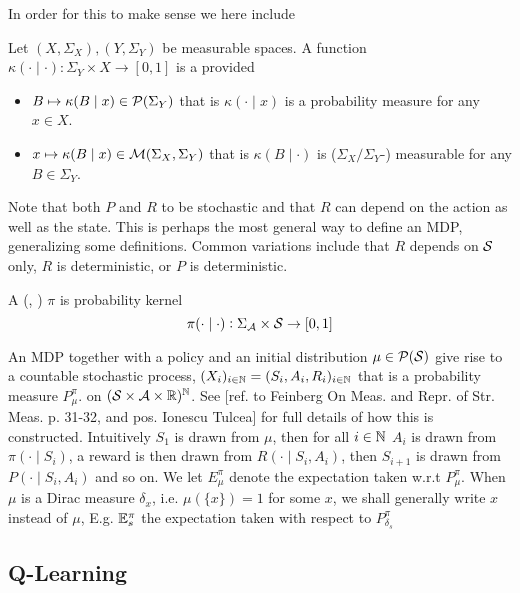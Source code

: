 \documentclass{article}
\begin{document}
In order for this to make sense we here include
\begin{defn}
  Let $(X, \Sigma_X), (Y, \Sigma_Y)$ be measurable spaces.
  A function $\kappa(\cdot \mid \cdot) : \Sigma_Y \times X \to [0,1]$
  is a  provided
  \begin{itemize}
    \item $B \mapsto \kappa(B \mid x) \in \mathcal{P}(\Sigma_Y)$
      that is $\kappa(\cdot \mid x)$ is a probability measure
      for any $x \in X$.
    \item $x \mapsto \kappa(B \mid x) \in \mathcal{M}(\Sigma_X, \Sigma_Y)$
      that is $\kappa(B \mid \cdot)$ is ($\Sigma_X/\Sigma_Y$-) measurable
      for any $B \in \Sigma_Y$.
  \end{itemize}
\end{defn}

Note that both $P$ and $R$ to be stochastic
and that $R$ can depend on the action as well as the state.
This is perhaps the most general way to define an MDP,
generalizing some definitions. Common variations include that
$R$ depends on $\mathcal{S}$ only,
$R$ is deterministic, or
$P$ is deterministic. %
\begin{defn}[Policy]
A (, ) 
$\pi$ is probability kernel
\[\pi(\cdot \mid \cdot) : \Sigma_{\mathcal{A}} \times \mathcal{S} \to [0,1] \]
\end{defn}

An MDP together with a policy and an initial distribution
$\mu \in \mathcal{P}(\mathcal{S})$
give rise to a countable stochastic process,
$ (X_i)_{i\in \mathbb{N}} = (S_i, A_i, R_i)_{i\in \mathbb{N}}$ 
that is a probability measure $P^\pi_\mu$. on
$(\mathcal{S} \times \mathcal{A} \times \mathbb{R})^\mathbb{N} $.
See [ref. to Feinberg On Meas. and Repr. of Str. Meas. p. 31-32,
and pos. Ionescu Tulcea] %
for full details of how this is constructed.
Intuitively $S_1$ is drawn from $\mu$,
then for all $i \in \mathbb{N}$
$A_i$ is drawn from $\pi(\cdot \mid S_i)$,
a reward is then drawn from $R(\cdot \mid S_i, A_i)$,
then $S_{i+1}$ is drawn from $P(\cdot \mid S_i, A_i)$ and so on.
We let $E^\pi_\mu$ denote the expectation taken w.r.t $P^\pi_\mu$.
When $\mu$ is a Dirac measure $\delta_x$, i.e. $\mu(\{x\}) = 1$ for some $x$,
we shall generally write $x$ instead of $\mu$,
E.g. $\mathbb{E}^\pi_s$ the expectation taken with respect to $P^\pi_{\delta_s}$

\subsection{Q-Learning}
\end{document}
